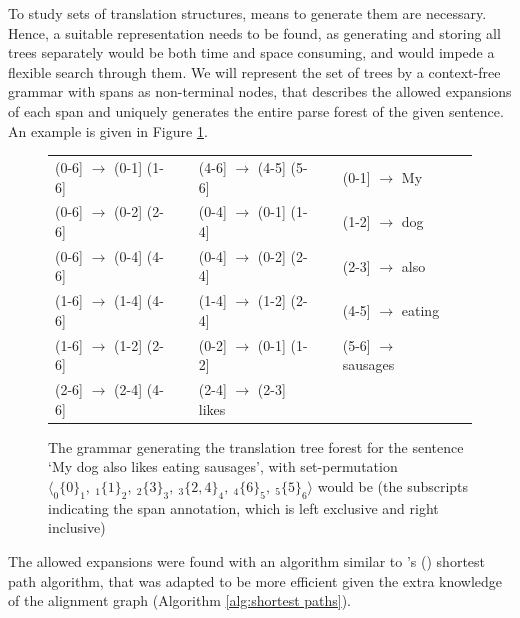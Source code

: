 \documentclass{report}
\theoremstyle{definition}
\theoremstyle{plain}
\def\citepos#1{\citeauthor{#1}'s (\citeyear{#1})}
\begin{document}
To study sets of translation structures, means to generate them are necessary. Hence, a suitable representation needs to be found, as generating and storing all trees separately would be both time and space consuming, and would impede a flexible search through them. We will represent the set of trees by a context-free grammar with spans as non-terminal nodes, that describes the allowed expansions of each span and uniquely generates the entire parse forest of the given sentence. An example is given in Figure \ref{fig:grammar}.

\begin{figure}[!ht]\begin{framed}
\small{
\begin{tabular}{llllll}
(0-6] $\rightarrow$ (0-1]  (1-6] && (4-6] $\rightarrow$ (4-5]  (5-6] && (0-1] $\rightarrow$ My\\
(0-6] $\rightarrow$ (0-2]  (2-6] && (0-4] $\rightarrow$ (0-1]  (1-4] && (1-2] $\rightarrow$ dog\\
(0-6] $\rightarrow$ (0-4]  (4-6] && (0-4] $\rightarrow$ (0-2]  (2-4] && (2-3] $\rightarrow$ also\\
(1-6] $\rightarrow$ (1-4]  (4-6] && (1-4] $\rightarrow$ (1-2]  (2-4] && (4-5] $\rightarrow$ eating\\
(1-6] $\rightarrow$ (1-2]  (2-6] && (0-2] $\rightarrow$ (0-1]  (1-2] && (5-6] $\rightarrow$ sausages\\
(2-6] $\rightarrow$ (2-4]  (4-6] && (2-4] $\rightarrow$ (2-3] likes\\
\end{tabular}
\caption{The grammar generating the translation tree forest for the sentence
`My dog also likes eating sausages', with set-permutation $\langle _0\{0\}_1,~ _1\{1\}_2,~ _2\{3\}_3,~ _3\{2,4\}_4, ~_4\{6\}_5,~ _5\{5\}_6\rangle$ would be (the subscripts indicating the span annotation, which is left exclusive and right inclusive)}\label{fig:grammar}
}
\end{framed}
\end{figure}

The allowed expansions were found with an algorithm similar to \citepos{dijkstra1959note} shortest path algorithm, that was adapted to be more efficient given the extra knowledge of the alignment graph (Algorithm \ref{alg:shortest paths}).
\end{document}
